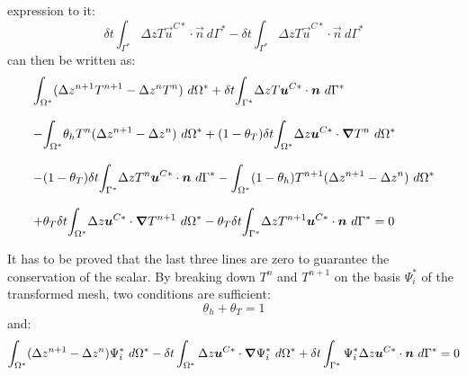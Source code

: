 expression to it:
\begin{equation}
\delta t\int_{\Gamma^{\ast}}\Delta zT\vec{u}^{C\ast}\cdot\vec{n}~d\Gamma^{\ast}
-\delta t\int_{\Gamma^{\ast}}\Delta zT\vec{u}^{C\ast}\cdot\vec{n}~d\Gamma^{\ast}
\end{equation}
can then be written as:
\begin{equation}
\begin{array}{l}
\displaystyle{\int_{\Omega^{\ast}}}
(\Delta z^{n+1}T^{n+1}-\Delta z^{n}T^{n})~d\Omega^{\ast}
+\delta t\displaystyle{\int_{\Gamma^{\ast}}}
\Delta zT\vec{u}^{C\ast}\cdot\vec{n}~d\Gamma^{\ast}\bigskip\\
-\displaystyle{\int_{\Omega^{\ast}}}
\theta_{h}T^{n}(\Delta z^{n+1}-\Delta z^{n})~d\Omega^{\ast}
+(1-\theta_{T})\delta t\displaystyle{\int_{\Omega^{\ast}}}
\Delta z\vec{u}^{C\ast}\cdot\Grad T^{n}~d\Omega^{\ast}\bigskip\\
-(1-\theta_{T})\delta t\displaystyle{\int_{\Gamma^{\ast}}}
\Delta zT^{n}\vec{u}^{C\ast}\cdot\vec{n}~d\Gamma^{\ast}
-\displaystyle{\int_{\Omega^{\ast}}}
(1-\theta_{h})T^{n+1}(\Delta z^{n+1}-\Delta z^{n})~d\Omega^{\ast}\bigskip\\
+\theta_{T}\delta t\displaystyle{\int_{\Omega^{\ast}}}
\Delta z\vec{u}^{C\ast}\cdot\Grad T^{n+1}~d\Omega^{\ast}
-\theta_{T}\delta t\displaystyle{\int_{\Gamma^{\ast}}}
\Delta zT^{n+1}\vec{u}^{C\ast}\cdot\vec{n}~d\Gamma^{\ast}=0
\end{array}
\end{equation}

It has to be proved that the last three lines are zero to guarantee the
conservation of the scalar. By breaking down $T^{n}$ and $T^{n+1}$ on the
basis $\Psi_{i}^{\ast}$ of the transformed mesh,
two conditions are sufficient:
\begin{equation}
\theta_{h}+\theta_{T}=1
\end{equation}
and:
\begin{equation}
\int_{\Omega^{\ast}}(\Delta z^{n+1}-\Delta z^{n})\Psi_{i}^{\ast}~d\Omega^{\ast}
-\delta t\int_{\Omega^{\ast}}\Delta z\bm{u}^{C\ast}\cdot\bm{\nabla} \Psi_{i}^{\ast}
~d\Omega^{\ast}+\delta t\int_{\Gamma^{\ast}}\Psi_{i}^{\ast}\Delta z\bm{u}^{C\ast}\cdot\bm{n}~d\Gamma^{\ast}=0
\label{eq:cond2}
\end{equation}

